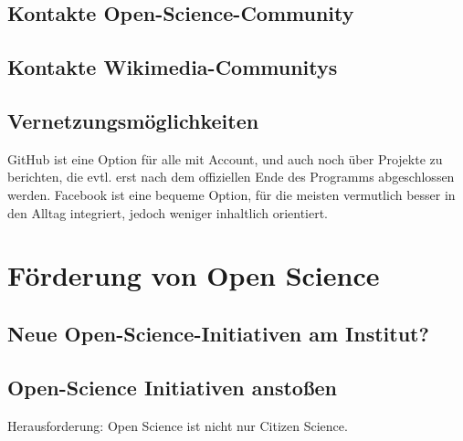 \documentclass[11pt,a4paper]{article}
\begin{document}
\subsection{Kontakte Open-Science-Community}%


\subsection{Kontakte Wikimedia-Communitys}%

\subsection{Vernetzungsmöglichkeiten} %
GitHub ist eine Option für alle mit Account, und auch noch über Projekte zu berichten, die evtl. erst nach dem offiziellen Ende des Programms abgeschlossen werden. Facebook ist eine bequeme Option, für die meisten vermutlich besser in den Alltag integriert, jedoch weniger inhaltlich orientiert.




\section{Förderung von Open Science} %
\subsection{Neue Open-Science-Initiativen am Institut?}


\subsection{Open-Science Initiativen anstoßen}
Herausforderung: Open Science ist nicht nur Citizen Science.
\end{document}
